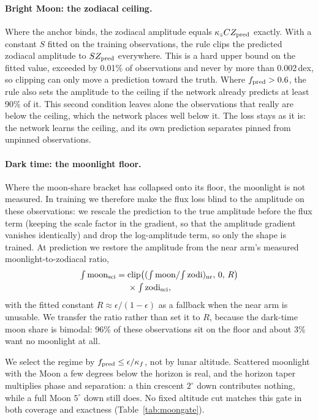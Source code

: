 \paragraph{Bright Moon: the zodiacal ceiling.} Where the anchor binds, the
zodiacal amplitude equals $\kappa_z C Z_{\rm pred}$ exactly. With a
constant $S$ fitted on the training observations, the rule clips the
predicted zodiacal amplitude to $S Z_{\rm pred}$ everywhere. This is a hard
upper bound on the fitted value, exceeded by 0.01\% of observations and
never by more than 0.002\,dex, so clipping can only move a prediction toward
the truth. Where $f_{\rm pred} > 0.6$, the rule also sets the amplitude to
the ceiling if the network already predicts at least 90\% of it. This second
condition leaves alone the observations that really are below the ceiling,
which the network places well below it. The loss stays as it is: the network
learns the ceiling, and its own prediction separates pinned from unpinned
observations.

\paragraph{Dark time: the moonlight floor.} Where the moon-share bracket has
collapsed onto its floor, the moonlight is not measured. In training we
therefore make the flux loss blind to the amplitude on these observations:
we rescale the prediction to the true amplitude before the flux term (keeping
the scale factor in the gradient, so that the amplitude gradient vanishes
identically) and drop the log-amplitude term, so only the shape is trained.
At prediction we restore the amplitude from the near arm's measured
moonlight-to-zodiacal ratio,
\begin{equation}
\begin{split}
  \textstyle\int{\rm moon}_{\rm sci} = {}&\mathrm{clip}\big(
  (\textstyle\int{\rm moon}/\!\int{\rm zodi})_{\rm nr},\,0,\,R\big)\\
  &\times\textstyle\int{\rm zodi}_{\rm sci},
\end{split}
\end{equation}
with the fitted constant $R\approx\epsilon/(1-\epsilon)$ as a fallback when
the near arm is unusable. We transfer the ratio rather than set it to $R$,
because the dark-time moon share is bimodal: 96\% of these observations sit
on the floor and about 3\% want no moonlight at all.

We select the regime by $f_{\rm pred}\le\epsilon/\kappa_f$, not by lunar
altitude. Scattered moonlight with the Moon a few degrees below the horizon
is real, and the horizon taper multiplies phase and separation: a thin
crescent $2^\circ$ down contributes nothing, while a full Moon $5^\circ$ down
still does. No fixed altitude cut matches this gate in both coverage and
exactness (Table~\ref{tab:moongate}).

